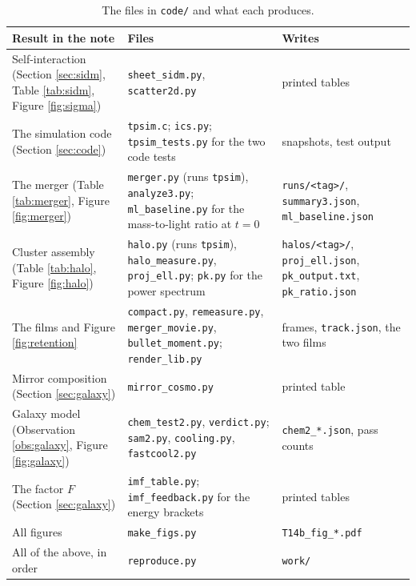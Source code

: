 \documentclass[11pt]{article}
\theoremstyle{definition}
\newcommand{\file}[1]{\texttt{#1}}
\begin{document}
\begin{table}[htbp]\centering\small
\begin{tabular}{@{}>{\raggedright\arraybackslash}p{}>{\raggedright\arraybackslash}p{}>{\raggedright\arraybackslash}p{}@{}}
\toprule
Result in the note & Files & Writes \\
\midrule
Self-interaction (Section \ref{sec:sidm}, Table \ref{tab:sidm}, Figure \ref{fig:sigma}) & \file{sheet\_sidm.py}, \file{scatter2d.py} & printed tables \\
The simulation code (Section \ref{sec:code}) & \file{tpsim.c}; \file{ics.py}; \file{tpsim\_tests.py} for the two code tests & snapshots, test output \\
The merger (Table \ref{tab:merger}, Figure \ref{fig:merger}) & \file{merger.py} (runs \file{tpsim}), \file{analyze3.py}; \file{ml\_baseline.py} for the mass-to-light ratio at $t = 0$ & \file{runs/<tag>/}, \file{summary3.json}, \file{ml\_baseline.json} \\
Cluster assembly (Table \ref{tab:halo}, Figure \ref{fig:halo}) & \file{halo.py} (runs \file{tpsim}), \file{halo\_measure.py}, \file{proj\_ell.py}; \file{pk.py} for the power spectrum & \file{halos/<tag>/}, \file{proj\_ell.json}, \file{pk\_output.txt}, \file{pk\_ratio.json} \\
The films and Figure \ref{fig:retention} & \file{compact.py}, \file{remeasure.py}, \file{merger\_movie.py}, \file{bullet\_moment.py}; \file{render\_lib.py} & frames, \file{track.json}, the two films \\
Mirror composition (Section \ref{sec:galaxy}) & \file{mirror\_cosmo.py} & printed table \\
Galaxy model (Observation \ref{obs:galaxy}, Figure \ref{fig:galaxy}) & \file{chem\_test2.py}, \file{verdict.py}; \file{sam2.py}, \file{cooling.py}, \file{fastcool2.py} & \file{chem2\_*.json}, pass counts \\
The factor $F$ (Section \ref{sec:galaxy}) & \file{imf\_table.py}; \file{imf\_feedback.py} for the energy brackets & printed tables \\
All figures & \file{make\_figs.py} & \file{T14b\_fig\_*.pdf} \\
All of the above, in order & \file{reproduce.py} & \file{work/} \\
\bottomrule
\end{tabular}
\caption{The files in \file{code/} and what each produces.}
\label{tab:files}
\end{table}
\end{document}
